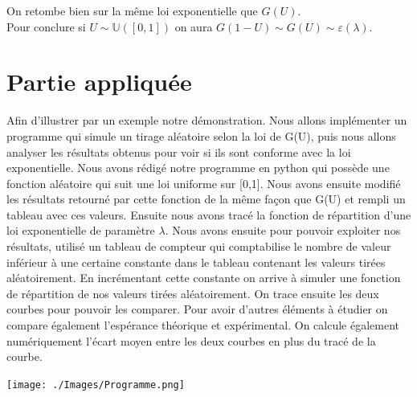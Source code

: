 \documentclass[12,french]{report}
\begin{document}
On retombe bien sur la même loi exponentielle que $G(U)$. \\

Pour conclure si $U\sim\mathbb{U}([0,1])$ on aura $G(1-U) \sim G(U)\sim \varepsilon(\lambda)$.

\chapter{Partie appliquée}

Afin d'illustrer par un exemple notre démonstration. Nous allons implémenter un programme qui simule un tirage aléatoire selon la loi de G(U), puis nous allons analyser les résultats obtenus pour voir si ils sont conforme avec la loi exponentielle. Nous avons rédigé notre programme en python qui possède une fonction aléatoire qui suit une loi uniforme sur [0,1]. Nous avons ensuite modifié les résultats retourné par cette fonction de la même façon que G(U) et rempli un tableau avec ces valeurs. Ensuite nous avons tracé la fonction de répartition d'une loi exponentielle de paramètre $\lambda$. Nous avons ensuite pour pouvoir exploiter nos résultats, utilisé un tableau de compteur qui comptabilise le nombre de valeur inférieur à une certaine constante dans le tableau contenant les valeurs tirées aléatoirement. En incrémentant cette constante on arrive à simuler une fonction de répartition de nos valeurs tirées aléatoirement. On trace ensuite les deux courbes pour pouvoir les comparer. Pour avoir d'autres éléments à étudier on compare également l'espérance théorique et expérimental. On calcule également numériquement l'écart moyen entre les deux courbes en plus du tracé de la courbe.
\begin{center}
	\texttt{[image: ./Images/Programme.png]}\\[1.0 cm]
\end{center}
\end{document}
